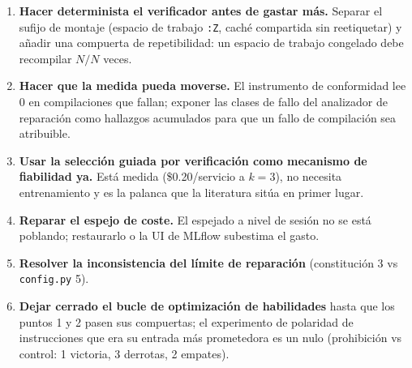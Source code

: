 \documentclass[11pt,a4paper]{article}
\begin{document}
\begin{enumerate}[leftmargin=1.4em]
  \item \textbf{Hacer determinista el verificador antes de gastar más.} Separar el
  sufijo de montaje (espacio de trabajo \texttt{:Z}, caché compartida sin
  reetiquetar) y añadir una compuerta de repetibilidad: un espacio de trabajo
  congelado debe recompilar $N/N$ veces.
  \item \textbf{Hacer que la medida pueda moverse.} El instrumento de conformidad lee
  0 en compilaciones que fallan; exponer las clases de fallo del analizador de
  reparación como hallazgos acumulados para que un fallo de compilación sea
  atribuible.
  \item \textbf{Usar la selección guiada por verificación como mecanismo de fiabilidad
  ya.} Está medida (\$0.20/servicio a $k{=}3$), no necesita entrenamiento y es la
  palanca que la literatura sitúa en primer lugar.
  \item \textbf{Reparar el espejo de coste.} El espejado a nivel de sesión no se está
  poblando; restaurarlo o la UI de MLflow subestima el gasto.
  \item \textbf{Resolver la inconsistencia del límite de reparación} (constitución 3
  vs \texttt{config.py} 5).
  \item \textbf{Dejar cerrado el bucle de optimización de habilidades} hasta que los
  puntos 1 y 2 pasen sus compuertas; el experimento de polaridad de instrucciones que
  era su entrada más prometedora es un nulo (prohibición vs control: 1 victoria, 3
  derrotas, 2 empates).
\end{enumerate}
\end{document}
